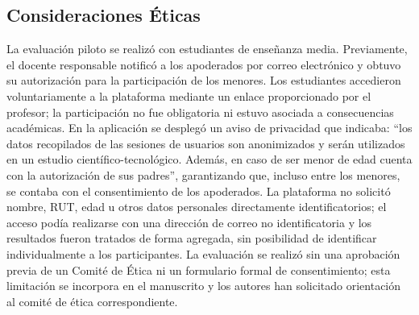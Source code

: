 \subsection{Consideraciones Éticas}

La evaluación piloto se realizó con estudiantes de enseñanza media. Previamente, el docente responsable notificó a los apoderados por correo electrónico y obtuvo su autorización para la participación de los menores. Los estudiantes accedieron voluntariamente a la plataforma mediante un enlace proporcionado por el profesor; la participación no fue obligatoria ni estuvo asociada a consecuencias académicas. En la aplicación se desplegó un aviso de privacidad que indicaba: ``los datos recopilados de las sesiones de usuarios son anonimizados y serán utilizados en un estudio científico-tecnológico. Además, en caso de ser menor de edad cuenta con la autorización de sus padres'', garantizando que, incluso entre los menores, se contaba con el consentimiento de los apoderados. La plataforma no solicitó nombre, RUT, edad u otros datos personales directamente identificatorios; el acceso podía realizarse con una dirección de correo no identificatoria y los resultados fueron tratados de forma agregada, sin posibilidad de identificar individualmente a los participantes. La evaluación se realizó sin una aprobación previa de un Comité de Ética ni un formulario formal de consentimiento; esta limitación se incorpora en el manuscrito y los autores han solicitado orientación al comité de ética correspondiente.